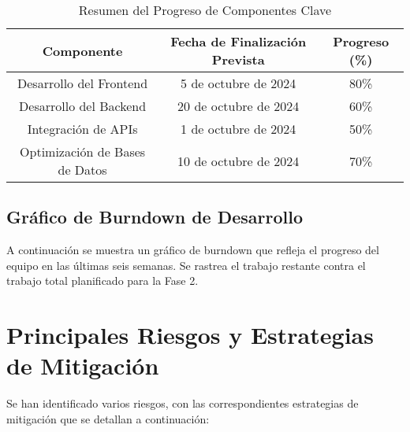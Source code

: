 \documentclass[12pt]{article}
\begin{document}
\begin{table}[h!]
\centering
\begin{tabular}{|c|c|c|}
\hline
\textbf{Componente} & \textbf{Fecha de Finalización Prevista} & \textbf{Progreso (\%)} \\
\hline
Desarrollo del Frontend & 5 de octubre de 2024 & 80\% \\
Desarrollo del Backend & 20 de octubre de 2024 & 60\% \\
Integración de APIs & 1 de octubre de 2024 & 50\% \\
Optimización de Bases de Datos & 10 de octubre de 2024 & 70\% \\
\hline
\end{tabular}
\caption{Resumen del Progreso de Componentes Clave}
\end{table}

\subsection{Gráfico de Burndown de Desarrollo}
A continuación se muestra un gráfico de burndown que refleja el progreso del equipo en las últimas seis semanas. Se rastrea el trabajo restante contra el trabajo total planificado para la Fase 2.

\begin{center}
\end{center}

\newpage
\section{Principales Riesgos y Estrategias de Mitigación}
Se han identificado varios riesgos, con las correspondientes estrategias de mitigación que se detallan a continuación:
\end{document}
